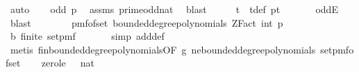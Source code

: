 \begin{isabellebody}
\ auto\isanewline
\isanewline
\ \ \isamarkupfalse%
\ {\isachardoublequoteopen}odd\ p{\isachardoublequoteclose}\ \isamarkupfalse%
\ assms\ prime{\isacharunderscore}{\kern0pt}odd{\isacharunderscore}{\kern0pt}nat\ \isamarkupfalse%
\ blast\isanewline
\ \ \isamarkupfalse%
\ \isamarkupfalse%
\ t\ \ t{\isacharunderscore}{\kern0pt}def{\isacharcolon}{\kern0pt}\ {\isachardoublequoteopen}p{\isacharequal}{\kern0pt}{}{\isacharasterisk}{\kern0pt}t{\isacharplus}{\kern0pt}{}{\isachardoublequoteclose}\ \isanewline
\ \ \ \ \isamarkupfalse%
\ oddE\ \isamarkupfalse%
\ blast\isanewline
\isanewline
\ \ \isamarkupfalse%
\ {\isasymOmega}\ \ {\isachardoublequoteopen}{\isasymOmega}\ {\isacharequal}{\kern0pt}\ pmf{\isacharunderscore}{\kern0pt}of{\isacharunderscore}{\kern0pt}set\ {\isacharparenleft}{\kern0pt}bounded{\isacharunderscore}{\kern0pt}degree{\isacharunderscore}{\kern0pt}polynomials\ {\isacharparenleft}{\kern0pt}ZFact\ {\isacharparenleft}{\kern0pt}int\ p{\isacharparenright}{\kern0pt}{\isacharparenright}{\kern0pt}\ {}{\isacharparenright}{\kern0pt}{\isachardoublequoteclose}\isanewline
\isanewline
\ \ \isamarkupfalse%
\ b{\isacharcolon}{\kern0pt}\ {\isachardoublequoteopen}finite\ {\isacharparenleft}{\kern0pt}set{\isacharunderscore}{\kern0pt}pmf\ {\isasymOmega}{\isacharparenright}{\kern0pt}{\isachardoublequoteclose}\isanewline
\ \ \ \ \isamarkupfalse%
\ {\isacharparenleft}{\kern0pt}simp\ add{\isacharcolon}{\kern0pt}{\isasymOmega}{\isacharunderscore}{\kern0pt}def{\isacharparenright}{\kern0pt}\isanewline
\ \ \ \ \isamarkupfalse%
\ {\isacharparenleft}{\kern0pt}metis\ fin{\isacharunderscore}{\kern0pt}bounded{\isacharunderscore}{\kern0pt}degree{\isacharunderscore}{\kern0pt}polynomials{\isacharbrackleft}{\kern0pt}OF\ g{\isacharbrackright}{\kern0pt}\ ne{\isacharunderscore}{\kern0pt}bounded{\isacharunderscore}{\kern0pt}degree{\isacharunderscore}{\kern0pt}polynomials\ set{\isacharunderscore}{\kern0pt}pmf{\isacharunderscore}{\kern0pt}of{\isacharunderscore}{\kern0pt}set{\isacharparenright}{\kern0pt}\isanewline
\isanewline
\ \ \isamarkupfalse%
\ zero{\isacharunderscore}{\kern0pt}le{\isacharunderscore}{\kern0pt}{}{\isacharcolon}{\kern0pt}\ {\isachardoublequoteopen}{}\ {\isacharless}{\kern0pt}\ {\isacharparenleft}{\kern0pt}{}{\isacharcolon}{\kern0pt}{\isacharcolon}{\kern0pt}nat{\isacharparenright}{\kern0pt}{\isachardoublequoteclose}\ \isamarkupfalse%

\end{isabellebody}
